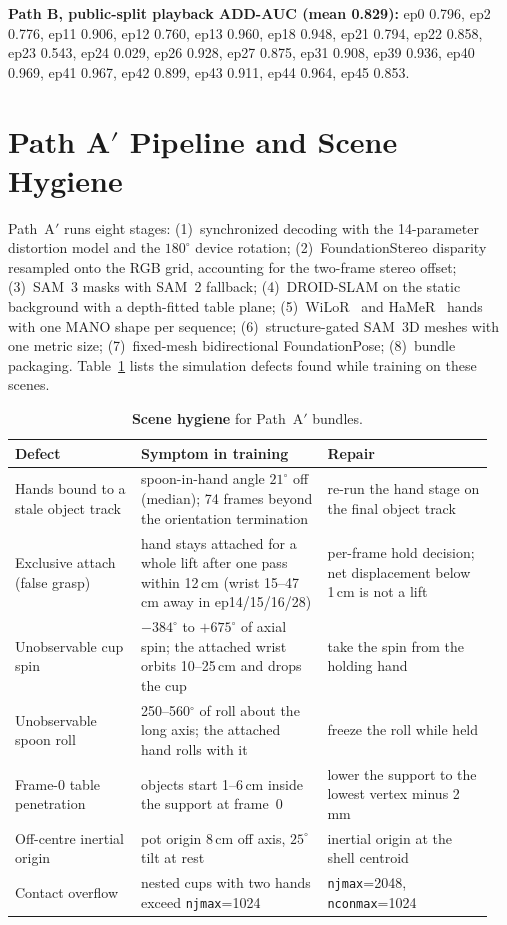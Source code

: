 \documentclass[10pt]{nvidiaextabstract}
\begin{document}
\textbf{Path B, public-split playback ADD-AUC (mean 0.829):} ep0 0.796, ep2 0.776, ep11 0.906, ep12 0.760, ep13 0.960, ep18 0.948, ep21 0.794, ep22 0.858, ep23 0.543, ep24 0.029, ep26 0.928, ep27 0.875, ep31 0.908, ep39 0.936, ep40 0.969, ep41 0.967, ep42 0.899, ep43 0.911, ep44 0.964, ep45 0.853.

\section{Path A$'$ Pipeline and Scene Hygiene}
\label{app:patha-prime}
Path~A$'$ runs eight stages: (1)~synchronized decoding with the 14-parameter distortion model and the $180^\circ$ device rotation; (2)~FoundationStereo disparity resampled onto the RGB grid, accounting for the two-frame stereo offset; (3)~SAM~3 masks with SAM~2 fallback; (4)~DROID-SLAM on the static background with a depth-fitted table plane; (5)~WiLoR~\cite{potamias2025wilor} and HaMeR~\cite{pavlakos2024hamer} hands with one MANO shape per sequence; (6)~structure-gated SAM~3D meshes with one metric size; (7)~fixed-mesh bidirectional FoundationPose; (8)~bundle packaging. Table~\ref{tab:hygiene} lists the simulation defects found while training on these scenes.

\begin{table}[h]
  \centering\footnotesize
  \setlength{\tabcolsep}{4pt}
  \begin{tabular}{@{}p{0.25\linewidth}p{0.37\linewidth}p{0.33\linewidth}@{}}
    \toprule
    \textbf{Defect} & \textbf{Symptom in training} & \textbf{Repair} \\
    \midrule
    Hands bound to a stale object track & spoon-in-hand angle $21^\circ$ off (median); 74 frames beyond the orientation termination & re-run the hand stage on the final object track \\
    Exclusive attach (false grasp) & hand stays attached for a whole lift after one pass within 12\,cm (wrist 15--47\,cm away in ep14/15/16/28) & per-frame hold decision; net displacement below 1\,cm is not a lift \\
    Unobservable cup spin & $-384^\circ$ to $+675^\circ$ of axial spin; the attached wrist orbits 10--25\,cm and drops the cup & take the spin from the holding hand \\
    Unobservable spoon roll & 250--560$^\circ$ of roll about the long axis; the attached hand rolls with it & freeze the roll while held \\
    Frame-0 table penetration & objects start 1--6\,cm inside the support at frame~0 & lower the support to the lowest vertex minus 2\,mm \\
    Off-centre inertial origin & pot origin 8\,cm off axis, $25^\circ$ tilt at rest & inertial origin at the shell centroid \\
    Contact overflow & nested cups with two hands exceed \texttt{njmax}=1024 & \texttt{njmax}=2048, \texttt{nconmax}=1024 \\
    \bottomrule
  \end{tabular}
  \caption{\textbf{Scene hygiene} for Path~A$'$ bundles.}
  \label{tab:hygiene}
\end{table}
\end{document}
